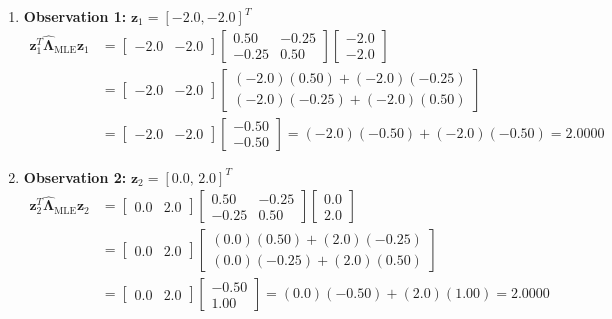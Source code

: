 \documentclass{article}
\begin{document}
\begin{enumerate}
    \item \textbf{Observation 1:} $\mathbf{z}_1 = [-2.0, -2.0]^T$
    \begin{align*}
    \mathbf{z}_1^T \hat{\boldsymbol{\Lambda}}_{\text{MLE}} \mathbf{z}_1 &= \begin{bmatrix} -2.0 & -2.0 \end{bmatrix} \begin{bmatrix} 0.50 & -0.25 \\ -0.25 & 0.50 \end{bmatrix} \begin{bmatrix} -2.0 \\ -2.0 \end{bmatrix} \\
    &= \begin{bmatrix} -2.0 & -2.0 \end{bmatrix} \begin{bmatrix} (-2.0)(0.50) + (-2.0)(-0.25) \\ (-2.0)(-0.25) + (-2.0)(0.50) \end{bmatrix} \\
    &= \begin{bmatrix} -2.0 & -2.0 \end{bmatrix} \begin{bmatrix} -0.50 \\ -0.50 \end{bmatrix} = (-2.0)(-0.50) + (-2.0)(-0.50) = \mathbf{2.0000}
    \end{align*}

    \item \textbf{Observation 2:} $\mathbf{z}_2 = [0.0, \, 2.0]^T$
    \begin{align*}
    \mathbf{z}_2^T \hat{\boldsymbol{\Lambda}}_{\text{MLE}} \mathbf{z}_2 &= \begin{bmatrix} 0.0 & 2.0 \end{bmatrix} \begin{bmatrix} 0.50 & -0.25 \\ -0.25 & 0.50 \end{bmatrix} \begin{bmatrix} 0.0 \\ 2.0 \end{bmatrix} \\
    &= \begin{bmatrix} 0.0 & 2.0 \end{bmatrix} \begin{bmatrix} (0.0)(0.50) + (2.0)(-0.25) \\ (0.0)(-0.25) + (2.0)(0.50) \end{bmatrix} \\
    &= \begin{bmatrix} 0.0 & 2.0 \end{bmatrix} \begin{bmatrix} -0.50 \\ 1.00 \end{bmatrix} = (0.0)(-0.50) + (2.0)(1.00) = \mathbf{2.0000}
    \end{align*}


\end{enumerate}
\end{document}
